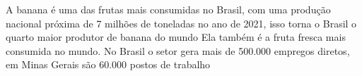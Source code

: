 A banana é uma das frutas mais consumidas no Brasil, com uma produção nacional próxima de 7 milhões de toneladas no ano de 2021, isso torna o Brasil o quarto maior produtor de banana do mundo \cite{banana} Ela também é a fruta fresca mais consumida no mundo. No Brasil o setor gera mais de 500.000 empregos diretos, em Minas Gerais são 60.000 postos de trabalho